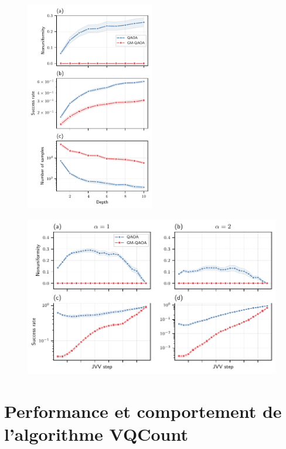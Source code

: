 \begin{figure}[h]
    \centering
    \includegraphics[width=0.5\textwidth]{figures/nae3sat-depth.pdf}
    \caption{}
    \label{fig:nae3sat-depth}
\end{figure}

\begin{figure}[h]
    \centering
    \includegraphics[width=1\textwidth]{figures/nae3sat-jvv-steps}
    \caption{}
    \label{fig:nae3sat-jvv-steps}
\end{figure}



\section{Performance et comportement de l'algorithme VQCount}

